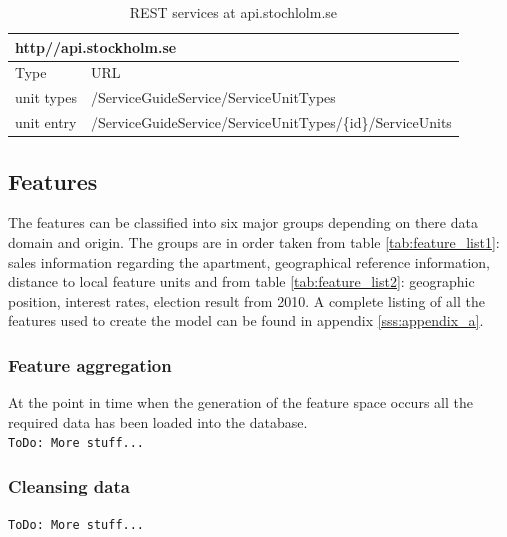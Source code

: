 \begin{table}[H]
\begin{tabular}{ | l | l | } 
\hline 
\multicolumn{2}{|l|}{http\://api.stockholm.se} \\
\hline
\hline
Type & URL \\
\hline
unit types & /ServiceGuideService/ServiceUnitTypes \\
unit entry & /ServiceGuideService/ServiceUnitTypes/\{id\}/ServiceUnits \\
\hline
\end{tabular}
\caption{REST services at api.stochlolm.se}
\label{tab:feature_rest}
\end{table}


\subsection{Features} \label{sss:features}
The features can be classified into six major groups depending on there data domain and origin. The groups are in order taken from table 
\ref{tab:feature_list1}: sales information regarding the apartment, geographical reference information, distance to local feature units and from table
\ref{tab:feature_list2}: geographic position, interest rates, election result from 2010. A complete listing of all the features used to create the model can be found in appendix \ref{sss:appendix_a}.

\subsubsection{Feature aggregation} \label{sss:feature_aggregation}
At the point in time when the generation of the feature space occurs all the required data has been loaded into the database.
\\
\texttt{ToDo: More stuff...}

%

\subsubsection{Cleansing data} \label{sss:data_cleansing}
\texttt{ToDo: More stuff...}

